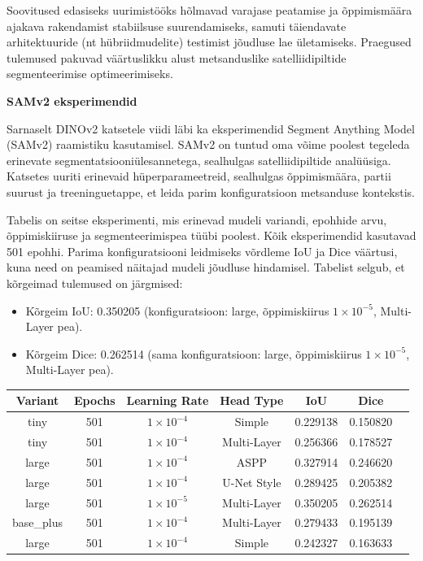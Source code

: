 Soovitused edasiseks uurimistööks hõlmavad varajase peatamise ja õppimismäära ajakava rakendamist stabiilsuse suurendamiseks, samuti täiendavate arhitektuuride (nt hübriidmudelite) testimist jõudluse lae ületamiseks. Praegused tulemused pakuvad väärtuslikku alust metsanduslike satelliidipiltide segmenteerimise optimeerimiseks.

\textbf{SAMv2 eksperimendid}

Sarnaselt DINOv2 katsetele viidi läbi ka eksperimendid Segment Anything Model (SAMv2) raamistiku kasutamisel. SAMv2 on tuntud oma võime poolest tegeleda erinevate segmentatsiooniülesannetega, sealhulgas satelliidipiltide analüüsiga. Katsetes uuriti erinevaid hüperparameetreid, sealhulgas õppimismäära, partii suurust ja treeninguetappe, et leida parim konfiguratsioon metsanduse kontekstis.

Tabelis on seitse eksperimenti, mis erinevad mudeli variandi, epohhide arvu,
õppimiskiiruse ja segmenteerimispea tüübi poolest. Kõik eksperimendid kasutavad
501 epohhi. Parima konfiguratsiooni leidmiseks võrdleme IoU ja Dice väärtusi, kuna need on peamised näitajad mudeli jõudluse hindamisel. Tabelist selgub, et kõrgeimad tulemused on järgmised:

\begin{itemize}
    \item Kõrgeim IoU:  0.350205 (konfiguratsioon: large, õppimiskiirus $1 \times 10^{-5}$, Multi-Layer pea).
    \item Kõrgeim Dice:  0.262514 (sama konfiguratsioon: large, õppimiskiirus $1 \times 10^{-5}$, Multi-Layer pea).
\end{itemize}


\begin{table}[H]
    \caption{Samv2 eksperimendi tulemused}
    \label{tab:samv2_results}
    \begin{longtable}{ccccccc}
    \hline
    Variant & Epochs & Learning Rate & Head Type & IoU & Dice \\
    \hline
        tiny &  501 & $1 \times 10^{-4}$ & Simple & 0.229138 & 0.150820\\
        tiny &  501 & $1 \times 10^{-4}$ & Multi-Layer & 0.256366 & 0.178527 \\
        large &  501 & $1 \times 10^{-4}$ & ASPP & 0.327914 & 0.246620  \\
        large &  501 & $1 \times 10^{-4}$ & U-Net Style & 0.289425 & 0.205382  \\
        large &  501 & $1 \times 10^{-5}$ & Multi-Layer & 0.350205 & 0.262514 \\
        base\_plus & 501 & $1 \times 10^{-4}$ & Multi-Layer & 0.279433 & 0.195139  \\
        large &  501 & $1 \times 10^{-4}$ & Simple & 0.242327 & 0.163633 \\
    \hline
\end{longtable}
\end{table}
\addtocounter{table}{-1}


